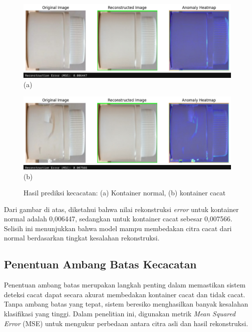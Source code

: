 \begin{figure}[H]
  \centering
  \begin{minipage}{\textwidth}
    \centering
    \includegraphics[width=\textwidth]{gambar/kontainer_bagus.jpeg}
    (a)
  \end{minipage}
  \vspace{1em}

  \begin{minipage}{\textwidth}
    \centering
    \includegraphics[width=\textwidth]{gambar/kontainer_cacat.jpeg}
    (b)
  \end{minipage}
  \caption{Hasil prediksi kecacatan: (a) Kontainer normal, (b)
  kontainer cacat}
  \label{fig:autoencoder-test}
  \vspace{-1em}
\end{figure}

Dari gambar di atas, diketahui bahwa nilai rekonstruksi
\textit{error} untuk kontainer
normal adalah 0,006447, sedangkan untuk kontainer cacat sebesar
0,007566. Selisih ini menunjukkan bahwa model mampu membedakan citra
cacat dari normal berdasarkan tingkat kesalahan rekonstruksi.

\vspace{1em}

\subsection{Penentuan Ambang Batas Kecacatan}
Penentuan ambang batas merupakan langkah penting dalam memastikan
sistem deteksi cacat dapat secara akurat membedakan kontainer cacat
dan tidak cacat. Tanpa ambang batas yang tepat, sistem beresiko
menghasilkan banyak kesalahan klasifikasi yang tinggi. Dalam
penelitian ini, digunakan metrik \textit{Mean Squared Error} (MSE) untuk
mengukur perbedaan antara citra asli dan hasil rekonstruksi.

